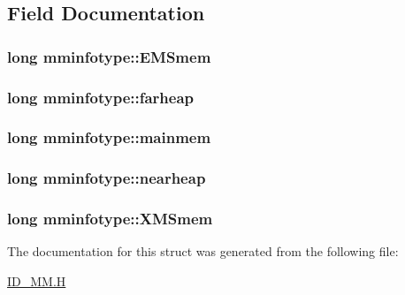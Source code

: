 \subsection{Field Documentation}
\hypertarget{structmminfotype_ab6834bcf941e98365c9b22c5f456623c}{
\subsubsection[{EMSmem}]{\setlength{\rightskip}{0pt plus 5cm}long {\bf mminfotype::EMSmem}}}
\label{structmminfotype_ab6834bcf941e98365c9b22c5f456623c}
\hypertarget{structmminfotype_a20ddd0ecf64b40369b4ccc142a2c5168}{
\subsubsection[{farheap}]{\setlength{\rightskip}{0pt plus 5cm}long {\bf mminfotype::farheap}}}
\label{structmminfotype_a20ddd0ecf64b40369b4ccc142a2c5168}
\hypertarget{structmminfotype_a14052febd497fb9b33325b9ff73c3f49}{
\subsubsection[{mainmem}]{\setlength{\rightskip}{0pt plus 5cm}long {\bf mminfotype::mainmem}}}
\label{structmminfotype_a14052febd497fb9b33325b9ff73c3f49}
\hypertarget{structmminfotype_af6669912582d407f8e3df71c1ee5b795}{
\subsubsection[{nearheap}]{\setlength{\rightskip}{0pt plus 5cm}long {\bf mminfotype::nearheap}}}
\label{structmminfotype_af6669912582d407f8e3df71c1ee5b795}
\hypertarget{structmminfotype_a2c8bc97d0a622b62a58bb5b2da195cbb}{
\subsubsection[{XMSmem}]{\setlength{\rightskip}{0pt plus 5cm}long {\bf mminfotype::XMSmem}}}
\label{structmminfotype_a2c8bc97d0a622b62a58bb5b2da195cbb}


The documentation for this struct was generated from the following file:\begin{DoxyCompactItemize}
\item 
\hyperlink{ID__MM_8H}{ID\_\-MM.H}\end{DoxyCompactItemize}
